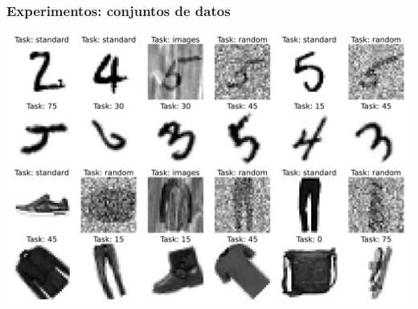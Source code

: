 \documentclass[aspectratio=43,spanish]{beamer}
\newcommand{\fdata}[1]{\textsf{#1}}
\begin{document}




  

\begin{frame}
      \frametitle{Experimentos: conjuntos de datos}
      \centering
      \includegraphics[width=.7\linewidth]{Chapter6/HAIS2022/hais22_datasets.pdf}

\end{frame}
\end{document}
